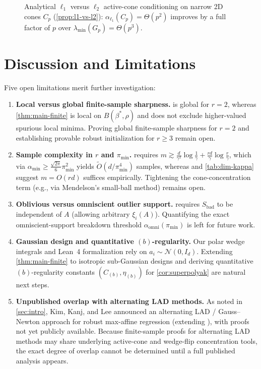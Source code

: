 \documentclass[11pt]{article}
\theoremstyle{plain}
\theoremstyle{remark}
\numberwithin{equation}{section}
\begin{document}
\begin{figure}[t]
  \centering
  
  \caption{Analytical $\ell_1$ versus $\ell_2$ active-cone conditioning on narrow 2D cones $C_p$ (\cref{prop:l1-vs-l2}): $\alpha_{\ell_1}(C_p) = \Theta(p^2)$ improves by a full factor of $p$ over $\lambda_{\min}(G_p) = \Theta(p^3)$.}
  \label{fig:cones}
\end{figure}

\section{Discussion and Limitations}
\label{sec:discussion}

Five open limitations merit further investigation:
\begin{enumerate}
  \item \textbf{Local versus global finite-sample sharpness.}  is global for $r = 2$, whereas \cref{thm:main-finite} is local on $B(\beta^*, \rho)$ and does not exclude higher-valued spurious local minima. Proving global finite-sample sharpness for $r = 2$ and establishing provable robust initialization for $r \ge 3$ remain open.
  \item \textbf{Sample complexity in $r$ and $\pi_{\min}$.}  requires $m \gtrsim \frac{d}{\gamma^2}\log\frac{1}{\gamma} + \frac{rd}{\gamma}\log\frac{r}{\gamma}$, which via $\alpha_{\min} \ge \frac{\sqrt{2\pi}}{6}\pi_{\min}^2$ yields $\tilde O(d/\pi_{\min}^4)$ samples, whereas \cite[Section~5.2.2; Figure~5 in arXiv:2201.04611]{charisopoulos2024superpolyak} and \cref{tab:dim-kappa} suggest $m = O(rd)$ suffices empirically. Tightening the cone-concentration term (e.g., via Mendelson's small-ball method) remains open.
  \item \textbf{Oblivious versus omniscient outlier support.}  requires $S_{\mathrm{bad}}$ to be independent of $A$ (allowing arbitrary $\xi_i(A)$). Quantifying the exact omniscient-support breakdown threshold $\alpha_{\mathrm{omni}}(\pi_{\min})$ is left for future work.
  \item \textbf{Gaussian design and quantitative $(b)$-regularity.} Our polar wedge integrals and Lean~4 formalization rely on $a_i \sim \mathcal{N}(0, I_d)$. Extending \cref{thm:main-finite} to isotropic sub-Gaussian designs and deriving quantitative $(b)$-regularity constants $(C_{(b)}, \eta_{(b)})$ for \cref{cor:superpolyak} are natural next steps.
  \item \textbf{Unpublished overlap with alternating LAD methods.} As noted in \cref{sec:intro}, Kim, Kanj, and Lee \cite{kim2024mds,kim2024thesis} announced an alternating LAD / Gauss--Newton approach for robust max-affine regression (extending \cite{kim2025robustpr}), with proofs not yet publicly available. Because finite-sample proofs for alternating LAD methods may share underlying active-cone and wedge-flip concentration tools, the exact degree of overlap cannot be determined until a full published analysis appears.
\end{enumerate}
\end{document}
